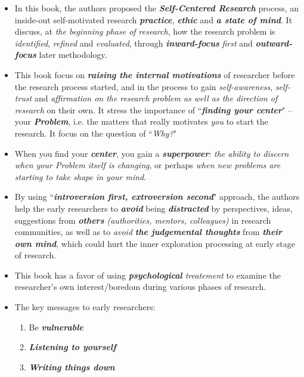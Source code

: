 \documentclass[11pt]{article}
\begin{document}
\begin{itemize}
\item In this book, the authors proposed the \emph{\textbf{Self-Centered Research}} process, an inside-out self-motivated research \emph{\textbf{practice}}, \emph{\textbf{ethic}} and \emph{\textbf{a state of mind}}. It discuss, at \emph{the beginning phase of research}, how the research problem is \emph{identified}, \emph{refined} and \emph{evaluated}, through \emph{\textbf{inward-focus}} \emph{first} and \emph{\textbf{outward-focus}} later methodology. 

\item This book focus on \emph{\textbf{raising the internal motivations}} of researcher before the research process started, and in the process to gain \emph{self-awareness}, \emph{self-trust} and \emph{affirmation on the research problem as well as the direction of research} on their own. It stress the importance of ``\emph{\textbf{finding your center}}" -- your \emph{\textbf{Problem}}, i.e. the matters that really motivates \emph{you} to start the research.  It focus on the question of ``\emph{Why?}"

\item When you find your \textbf{\emph{center}}, you gain a \textbf{\emph{superpower}}: \emph{the ability to discern when your Problem itself is changing}, or perhaps \emph{when new problems are starting to take shape in your mind}. 

\item By using ``\emph{\textbf{introversion first, extroversion second}}" approach, the authors help the early researchers to \emph{\textbf{avoid}} being \emph{\textbf{distracted}} by perspectives, ideas, suggestions from \emph{\textbf{others} (authorities, mentors, colleagues)} in research communities, as well as to \emph{avoid} \emph{\textbf{the judgemental thoughts}} from \emph{\textbf{their own mind}}, which could hurt the inner exploration processing at early stage of research. 

\item This book has a favor of using \emph{\textbf{psychological} treatement} to examine the researcher's own interest/boredom during various phases of research.

\item The key messages to early researchers:
\begin{enumerate}
\item Be  \emph{\textbf{vulnerable}}
\item \emph{\textbf{Listening to yourself}}
\item \emph{\textbf{Writing things down}}
\end{enumerate}


\end{itemize}
\end{document}
